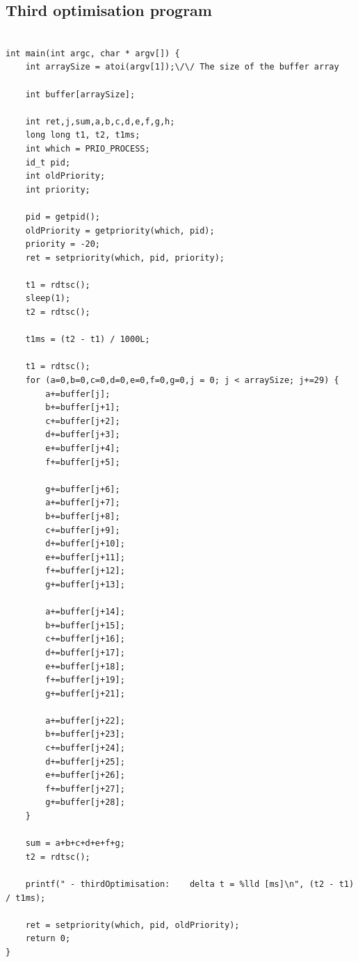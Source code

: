 \documentclass[a4paper,10pt]{article}
\begin{document}
				
				\subsection{Third optimisation program}

				
								\begin{lstlisting} 

int main(int argc, char * argv[]) {
    int arraySize = atoi(argv[1]);\/\/ The size of the buffer array
	
	int buffer[arraySize];
	
	int ret,j,sum,a,b,c,d,e,f,g,h;
	long long t1, t2, t1ms;
	int which = PRIO_PROCESS;
	id_t pid;
	int oldPriority;
	int priority;
	
	pid = getpid();
	oldPriority = getpriority(which, pid);
	priority = -20;
	ret = setpriority(which, pid, priority);
	
	t1 = rdtsc();
	sleep(1);
	t2 = rdtsc();
	
	t1ms = (t2 - t1) / 1000L;
	
	t1 = rdtsc();
	for (a=0,b=0,c=0,d=0,e=0,f=0,g=0,j = 0; j < arraySize; j+=29) {
		a+=buffer[j];
		b+=buffer[j+1];
		c+=buffer[j+2];
		d+=buffer[j+3];
		e+=buffer[j+4];
		f+=buffer[j+5];

		g+=buffer[j+6];
		a+=buffer[j+7];
		b+=buffer[j+8];
		c+=buffer[j+9];
		d+=buffer[j+10];
		e+=buffer[j+11];
		f+=buffer[j+12];
		g+=buffer[j+13];

		a+=buffer[j+14];
		b+=buffer[j+15];
		c+=buffer[j+16];
		d+=buffer[j+17];
		e+=buffer[j+18];
		f+=buffer[j+19];
		g+=buffer[j+21];

		a+=buffer[j+22];
		b+=buffer[j+23];
		c+=buffer[j+24];
		d+=buffer[j+25];
		e+=buffer[j+26];
		f+=buffer[j+27];
		g+=buffer[j+28];
	}
	
	sum = a+b+c+d+e+f+g;
	t2 = rdtsc();
	
	printf(" - thirdOptimisation:    delta t = %lld [ms]\n", (t2 - t1) / t1ms);
	
	ret = setpriority(which, pid, oldPriority);
	return 0;
}
\end{lstlisting}
\end{document}
